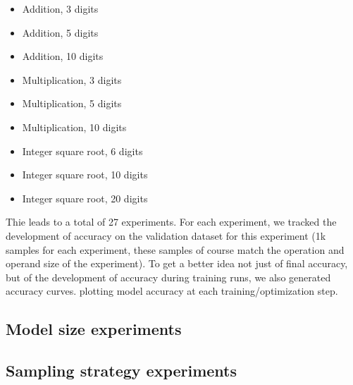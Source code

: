 \begin{itemize}
	\item Addition, 3 digits
	\item Addition, 5 digits
	\item Addition, 10 digits
	\item Multiplication, 3 digits
	\item Multiplication, 5 digits
	\item Multiplication, 10 digits
	\item Integer square root, 6 digits
	\item Integer square root, 10 digits
	\item Integer square root, 20 digits
\end{itemize}

Thie leads to a total of 27 experiments.
For each experiment, we tracked the development of accuracy on the validation dataset for this experiment (1k samples for each experiment, these samples of course match the operation and operand size of the experiment).
To get a better idea not just of final accuracy, but of the development of accuracy during training runs, we also generated accuracy curves. plotting model accuracy at each training/optimization step.



\subsection{Model size experiments}



\subsection{Sampling strategy experiments}




